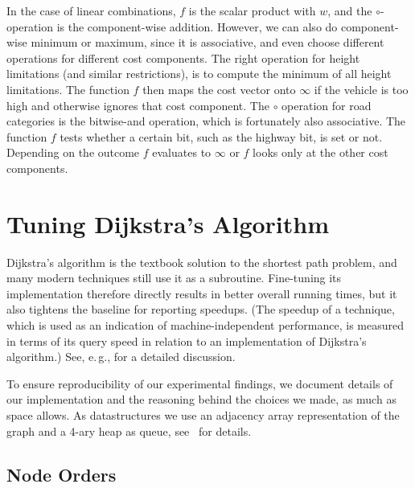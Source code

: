 \documentclass{sig-alternate}
\newcommand{\eg}{e.\,g.\xspace}
\newcommand{\queryweight}{\ensuremath{w}}
\begin{document}
In the case of linear combinations, $f$ is the scalar product with $\queryweight$, and the $\circ$-operation is the component-wise addition. 
However, we can also do component-wise minimum or maximum, since it is associative, and even choose different operations for different cost components.
The right operation for height limitations (and similar restrictions), is to compute the minimum of all height limitations. 
The function $f$ then maps the cost vector onto $\infty$ if the vehicle is too high and otherwise ignores that cost component. 
The $\circ$ operation for road categories is the bitwise-and operation, which is fortunately also associative.
The function $f$ tests whether a certain bit, such as the highway bit, is set or not. 
Depending on the outcome $f$ evaluates to $\infty$ or $f$ looks only at the other cost components. 

\section{Tuning Dijkstra's Algorithm}\label{sec:node-order}

Dijkstra's algorithm \cite{d-ntpcg-59} is the textbook solution to
the shortest path problem, and many modern techniques still use it as a subroutine. Fine-tuning its implementation therefore directly results in better overall running times, but it also tightens the baseline for reporting speedups. (The speedup of a technique, which is used as an indication of machine-independent performance, is measured in terms of its query speed in relation to an implementation of Dijkstra's algorithm.) 
See, \eg, \cite{bdgmpsww-rptn-14} for a detailed discussion.



To ensure reproducibility of our experimental findings, we document details of our implementation and the reasoning behind the choices we made, as much as space allows. As datastructures we use an adjacency array representation of the graph and a 4-ary heap as queue, see~\cite{bdgmpsww-rptn-14} for details.



\subsection{Node Orders}
\end{document}
